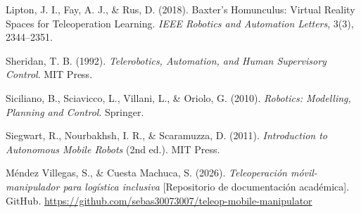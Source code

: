 \documentclass[12pt,letterpaper]{article}
\begin{document}
Lipton, J. I., Fay, A. J., \& Rus, D. (2018). Baxter's Homunculus: Virtual Reality Spaces for Teleoperation Learning. \textit{IEEE Robotics and Automation Letters}, 3(3), 2344--2351.

Sheridan, T. B. (1992). \textit{Telerobotics, Automation, and Human Supervisory Control}. MIT Press.

Siciliano, B., Sciavicco, L., Villani, L., \& Oriolo, G. (2010). \textit{Robotics: Modelling, Planning and Control}. Springer.

Siegwart, R., Nourbakhsh, I. R., \& Scaramuzza, D. (2011). \textit{Introduction to Autonomous Mobile Robots} (2nd ed.). MIT Press.

Méndez Villegas, S., \& Cuesta Machuca, S. (2026). \textit{Teleoperación móvil-manipulador para logística inclusiva} [Repositorio de documentación académica]. GitHub. \url{https://github.com/sebas30073007/teleop-mobile-manipulator}
\end{document}

